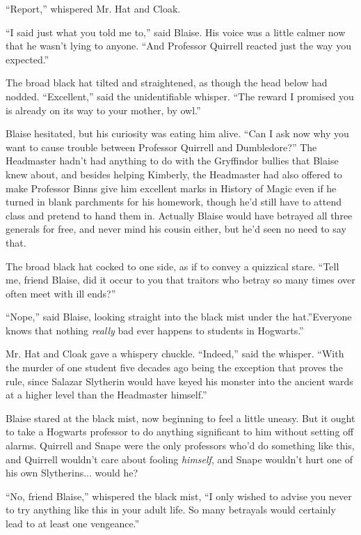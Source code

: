 ``Report,'' whispered Mr. Hat and Cloak.

``I said just what you told me to,'' said Blaise. His voice was a little
calmer now that he wasn't lying to anyone. ``And Professor Quirrell
reacted just the way you expected.''

The broad black hat tilted and straightened, as though the head below
had nodded. ``Excellent,'' said the unidentifiable whisper. ``The reward
I promised you is already on its way to your mother, by owl.''

Blaise hesitated, but his curiosity was eating him alive. ``Can I ask
now why you want to cause trouble between Professor Quirrell and
Dumbledore?'' The Headmaster hadn't had anything to do with the
Gryffindor bullies that Blaise knew about, and besides helping Kimberly,
the Headmaster had also offered to make Professor Binns give him
excellent marks in History of Magic even if he turned in blank
parchments for his homework, though he'd still have to attend class and
pretend to hand them in. Actually Blaise would have betrayed all three
generals for free, and never mind his cousin either, but he'd seen no
need to say that.

The broad black hat cocked to one side, as if to convey a quizzical
stare. ``Tell me, friend Blaise, did it occur to you that traitors who
betray so many times over often meet with ill ends?''

``Nope,'' said Blaise, looking straight into the black mist under the
hat.''Everyone knows that nothing \emph{really} bad ever happens to
students in Hogwarts.''

Mr. Hat and Cloak gave a whispery chuckle. ``Indeed,'' said the whisper.
``With the murder of one student five decades ago being the exception
that proves the rule, since Salazar Slytherin would have keyed his
monster into the ancient wards at a higher level than the Headmaster
himself.''

Blaise stared at the black mist, now beginning to feel a little uneasy.
But it ought to take a Hogwarts professor to do anything significant to
him without setting off alarms. Quirrell and Snape were the only
professors who'd do something like this, and Quirrell wouldn't care
about fooling \emph{himself}, and Snape wouldn't hurt one of his own
Slytherins... would he?

``No, friend Blaise,'' whispered the black mist, ``I only wished to
advise you never to try anything like this in your adult life. So many
betrayals would certainly lead to at least one vengeance.''

